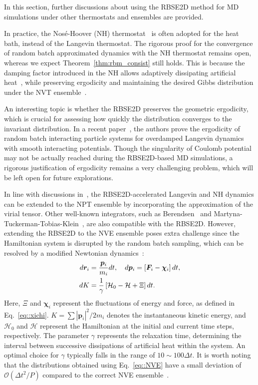 In this section, further discussions about using the RBSE2D method for MD simulations under other thermostats and ensembles are provided.

In practice, the Nos{\'e}-Hoover (NH) thermostat~\cite{hoover1985canonical} is often adopted for the heat bath, instead of the Langevin thermostat. 
The rigorous proof for the convergence of random batch approximated dynamics with the NH thermostat remains open, whereas we expect Theorem~\ref{thm:rbm_consist} still holds. 
This is because the damping factor introduced in the NH allows adaptively dissipating artificial heat~\cite{jones2011adaptive}, while preserving ergodicity and maintaining the desired Gibbs distribution under the NVT ensemble~\cite{herzog2018exponential}.

An interesting topic is whether the RBSE2D preserves the geometric ergodicity, which is crucial for assessing how quickly the distribution converges to the invariant distribution. 
In a recent paper~\cite{jin2023ergodicity}, the authors prove the ergodicity of random batch interacting particle systems for overdamped Langevin dynamics with smooth interacting potentials. 
Though the singularity of Coulomb potential may not be actually reached during the RBSE2D-based MD simulations, a rigorous justification of ergodicity remains a very challenging problem, which will be left open for future explorations.

In line with discussions in~\cite{10.1063/5.0107140}, the RBSE2D-accelerated Langevin and NH dynamics can be extended to the NPT ensemble by incorporating the approximation of the virial tensor. Other well-known integrators, such as Berendsen~\cite{berendsen1984molecular} and Martyna-Tuckerman-Tobias-Klein~\cite{martyna1996explicit}, are also compatible with the RBSE2D. However, extending the RBSE2D to the NVE ensemble poses extra challenge since the Hamiltonian system is disrupted by the random batch sampling, which can be resolved by a modified Newtonian dynamics~\cite{liang2023energy}:
\begin{equation}\label{eq::NVE}
	\begin{split}
		d\boldsymbol{r}_i&=\frac{\boldsymbol{p}_i}{m_i}dt,\quad d \bm{p}_i=\left[\boldsymbol{F}_i-\bm{\chi}_i\right]dt,\\
		dK&=\frac{1}{\gamma}\left[\mathcal H_0-\mathcal H+\Xi\right] dt.
	\end{split}
\end{equation}
Here, $\Xi$ and $\bm{\chi}_i$ represent the fluctuations of energy and force, as defined in Eq.~\eqref{eq::xichi}. $K=\sum |\bm{p}_i|^2/2m_i$ denotes the instantaneous kinetic energy, and $\mathcal H_0$ and $\mathcal H$ represent the Hamiltonian at the initial and current time steps, respectively. The parameter $\gamma$ represents the relaxation time, determining the interval between successive dissipations of artificial heat within the system. An optimal choice for $\gamma$ typically falls in the range of $10\sim 100\Delta t$. It is worth noting that the distributions obtained using Eq.~\eqref{eq::NVE} have a small deviation of $\mathcal{O}(\Delta t^2/P)$ compared to the correct NVE ensemble~\cite{liang2023energy}.


